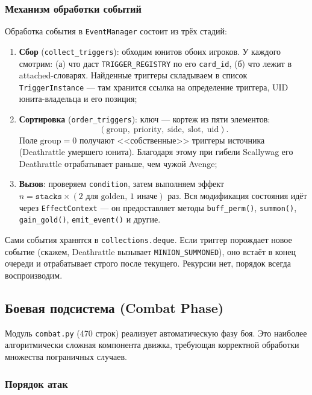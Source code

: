 \documentclass[a4paper,12pt]{extarticle}
\begin{document}
\subsubsection{Механизм обработки событий}

Обработка события в \texttt{EventManager} состоит из трёх стадий:

\begin{enumerate}[noitemsep]
  \item \textbf{Сбор} (\texttt{collect\_triggers}): обходим юнитов обоих игроков. У каждого смотрим: (а) что даст \texttt{TRIGGER\_REGISTRY} по его \texttt{card\_id}, (б) что лежит в attached-словарях. Найденные триггеры складываем в список \texttt{TriggerInstance} --- там хранится ссылка на определение триггера, UID юнита-владельца и его позиция;

  \item \textbf{Сортировка} (\texttt{order\_triggers}): ключ --- кортеж из пяти элементов:
  $$(\text{group},\; \text{priority},\; \text{side},\; \text{slot},\; \text{uid})\text{.}$$
  Поле $\text{group}=0$ получают <<собственные>> триггеры источника (Deathrattle умершего юнита). Благодаря этому при гибели Scallywag его Deathrattle отрабатывает раньше, чем чужой Avenge;

  \item \textbf{Вызов}: проверяем \texttt{condition}, затем выполняем эффект $n = \texttt{stacks} \times (2\text{ для golden, }1\text{ иначе})$ раз. Вся модификация состояния идёт через \texttt{EffectContext} --- он предоставляет методы \texttt{buff\_perm()}, \texttt{summon()}, \texttt{gain\_gold()}, \texttt{emit\_event()} и другие.
\end{enumerate}

Сами события хранятся в \texttt{collections.deque}. Если триггер порождает новое событие (скажем, Deathrattle вызывает \texttt{MINION\_SUMMONED}), оно встаёт в конец очереди и отрабатывает строго после текущего. Рекурсии нет, порядок всегда воспроизводим.

\subsection{Боевая подсистема (Combat Phase)}

Модуль \texttt{combat.py} (470 строк) реализует автоматическую фазу боя. Это наиболее алгоритмически сложная компонента движка, требующая корректной обработки множества пограничных случаев.

\subsubsection{Порядок атак}
\end{document}
